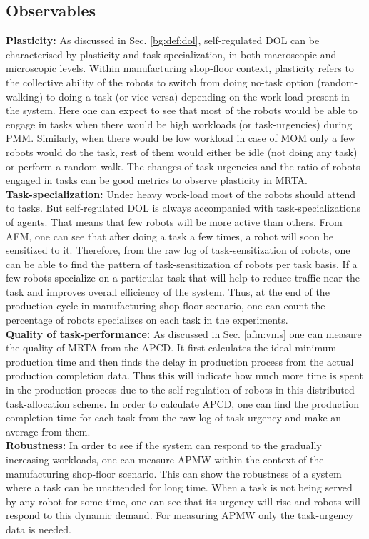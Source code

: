 \subsection{Observables}
\textbf{Plasticity:} As discussed in Sec. \ref{bg:def:dol},  self-regulated DOL can be characterised by plasticity and task-specialization, in both macroscopic and microscopic levels. Within manufacturing shop-floor context, plasticity refers to the collective ability of the robots to switch from doing no-task option (random-walking) to doing a task (or vice-versa) depending on the work-load present in the system. Here one can expect to see that most of the robots would be able to engage in tasks when there would be high workloads (or task-urgencies) during PMM. Similarly, when there would be low workload in case of MOM only a few robots would do the task, rest of them would either be idle (not doing any task) or perform a random-walk.  The changes of task-urgencies and the ratio of robots engaged in tasks can be good metrics to observe plasticity in MRTA.\\
\textbf{Task-specialization:} Under heavy work-load most of the robots should attend to tasks. But self-regulated DOL is always accompanied with task-specializations of agents. That means that few robots will be more active than others. From AFM, one can see that after doing a task a few times, a robot will soon be sensitized to it. Therefore, from the raw log of task-sensitization of robots, one can be able to find the pattern of task-sensitization of robots per task basis. If a few robots specialize on a particular task that will help to reduce traffic near the task and improves overall efficiency of the system. Thus, at the end of the production cycle in manufacturing shop-floor scenario, one can count the percentage of robots specializes on each task in the experiments.\\
\textbf{Quality of task-performance:} As discussed in Sec. \ref{afm:vms} one can measure the quality of MRTA from the APCD. It first calculates the ideal minimum production time and then finds the delay in production process from the actual production completion data. Thus this will indicate how much more time is  spent in the production process due to the self-regulation of robots in this distributed task-allocation scheme.  In order to calculate APCD, one can find the production completion time for each task from the raw log of task-urgency and make an average from them.\\
\textbf{Robustness:} In order to see if  the system can respond to the gradually increasing workloads,  one can measure APMW within the context of the manufacturing shop-floor scenario. This can show the robustness of a system where a task can be  unattended for long time. When a task is not being served by any robot for some time, one can see that its urgency will rise and robots will respond to this dynamic demand. For measuring APMW  only the task-urgency data is needed.\\

